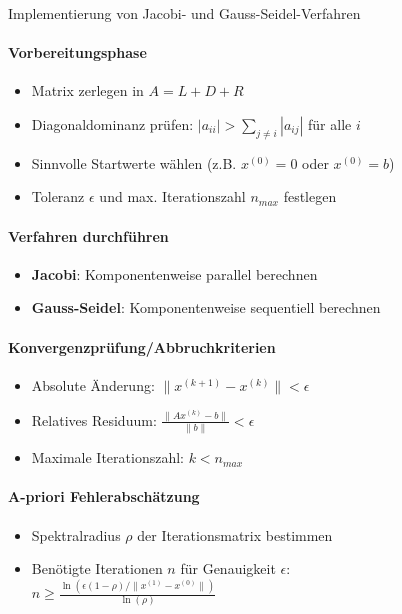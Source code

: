 \begin{KR}{Implementierung von Jacobi- und Gauss-Seidel-Verfahren}
    \paragraph{Vorbereitungsphase}
    \begin{itemize}
        \item Matrix zerlegen in $A = L + D + R$
        \item Diagonaldominanz prüfen: $|a_{ii}| > \sum_{j\neq i} |a_{ij}|$ für alle $i$
        \item Sinnvolle Startwerte wählen (z.B. $x^{(0)}=0$ oder $x^{(0)}=b$)
        \item Toleranz $\epsilon$ und max. Iterationszahl $n_{max}$ festlegen
    \end{itemize}

    \paragraph{Verfahren durchführen}
    \begin{itemize}
        \item \textbf{Jacobi}: Komponentenweise parallel berechnen 
        \item \textbf{Gauss-Seidel}: Komponentenweise sequentiell berechnen 
    \end{itemize}

    \paragraph{Konvergenzprüfung/Abbruchkriterien}
    \begin{itemize}
        \item Absolute Änderung: $\|x^{(k+1)} - x^{(k)}\| < \epsilon$
        \item Relatives Residuum: $\frac{\|Ax^{(k)} - b\|}{\|b\|} < \epsilon$
        \item Maximale Iterationszahl: $k < n_{max}$
    \end{itemize}

    \paragraph{A-priori Fehlerabschätzung}
    \begin{itemize}
        \item Spektralradius $\rho$ der Iterationsmatrix bestimmen
        \item Benötigte Iterationen $n$ für Genauigkeit $\epsilon$:\\
        $n \geq \frac{\ln(\epsilon(1-\rho)/\|x^{(1)}-x^{(0)}\|)}{\ln(\rho)}$
    \end{itemize}
\end{KR}







